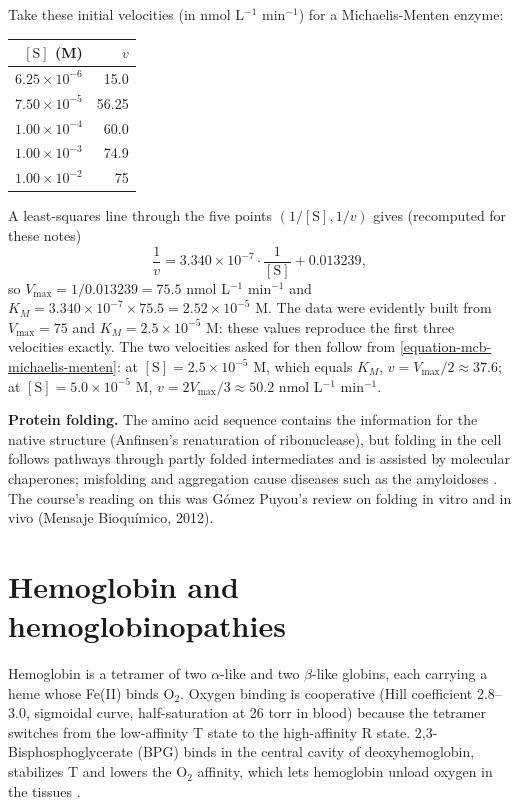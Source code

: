 \begin{example}
\label{example-mcb-exam-kinetics}
Take these initial
velocities (in nmol L$^{-1}$ min$^{-1}$) for
a Michaelis-Menten enzyme:

\begin{center}
\begin{tabular}{rr}
$[\mathrm{S}]$ (M) & $v$ \\
\hline
$6.25 \times 10^{-6}$ & 15.0 \\
$7.50 \times 10^{-5}$ & 56.25 \\
$1.00 \times 10^{-4}$ & 60.0 \\
$1.00 \times 10^{-3}$ & 74.9 \\
$1.00 \times 10^{-2}$ & 75 \\
\end{tabular}
\end{center}

A least-squares line through the five points
$(1/[\mathrm{S}], 1/v)$ gives (recomputed for
these notes)
$$
\frac{1}{v} = 3.340 \times 10^{-7} \cdot
\frac{1}{[\mathrm{S}]} + 0.013239,
$$
so $V_{\max} = 1/0.013239 = 75.5$ nmol
L$^{-1}$ min$^{-1}$ and $K_M = 3.340 \times
10^{-7} \times 75.5 = 2.52 \times 10^{-5}$ M. The data
were evidently built from $V_{\max} = 75$ and
$K_M = 2.5 \times 10^{-5}$ M: these values
reproduce the first three velocities exactly.
The two velocities asked for then follow from
\eqref{equation-mcb-michaelis-menten}: at
$[\mathrm{S}] = 2.5 \times 10^{-5}$ M, which
equals $K_M$, $v = V_{\max}/2 \approx 37.6$;
at $[\mathrm{S}] = 5.0 \times 10^{-5}$ M, $v
= 2V_{\max}/3 \approx 50.2$ nmol L$^{-1}$
min$^{-1}$.
\end{example}

\textbf{Protein folding.}
The amino acid sequence contains the
information for the native structure
(Anfinsen's renaturation of ribonuclease),
but folding in the cell follows pathways
through partly folded intermediates and is
assisted by molecular chaperones; misfolding
and aggregation cause diseases such as the
amyloidoses \cite[Section
6-5]{voet2013fundamentals}. The course's
reading on this was Gómez Puyou's review on
folding in vitro and in vivo (Mensaje
Bioquímico, 2012).

\section{Hemoglobin and hemoglobinopathies}
\label{section-mcb-hemoglobin}

Hemoglobin is a tetramer of two $\alpha$-like
and two $\beta$-like globins, each carrying a
heme whose Fe(II) binds $\mathrm{O_2}$.
Oxygen binding is cooperative (Hill
coefficient 2.8--3.0, sigmoidal curve,
half-saturation at 26 torr in blood) because
the tetramer switches from the low-affinity T
state to the high-affinity R state.
2,3-Bisphosphoglycerate (BPG) binds in the
central cavity of deoxyhemoglobin, stabilizes
T and lowers the $\mathrm{O_2}$ affinity,
which lets hemoglobin unload oxygen in the
tissues \cite[Section
7-1]{voet2013fundamentals}.

